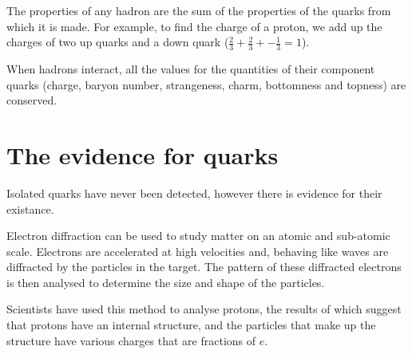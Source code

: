 \documentclass{article}
\begin{document}
The properties of any hadron are the sum of the properties of the quarks from
which it is made. For example, to find the charge of a proton, we add up the
charges of two up quarks and a down quark ($\frac{2}{3}+\frac{2}{3}+-\frac{1}{3}
= 1$).

When hadrons interact, all the values for the quantities of their
component quarks (charge, baryon number, strangeness, charm, bottomness and
topness) are conserved.

\section*{The evidence for quarks}

Isolated quarks have never been detected, however there is evidence for their
existance.

Electron diffraction can be used to study matter on an atomic and sub-atomic
scale. Electrons are accelerated at high velocities and, behaving like waves are
diffracted by the particles in the target. The pattern of these diffracted
electrons is then analysed to determine the size and shape of the particles.

Scientists have used this method to analyse protons, the results of which
suggest that protons have an internal structure, and the particles that make up
the structure have various charges that are fractions of $e$.

\end{document}
